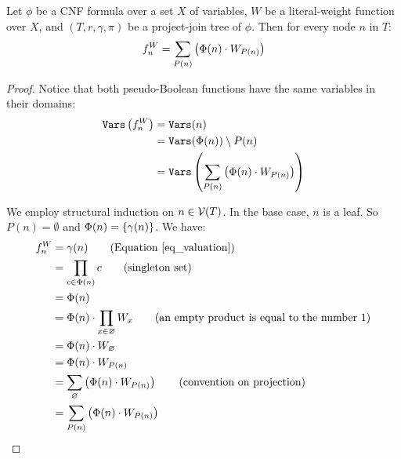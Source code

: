 \pagebreak

\begin{lemma}
\label{lemma_valuation}
    Let $\phi$ be a CNF formula over a set $X$ of variables, $W$ be a literal-weight function over $X$, and $(T, r, \gamma, \pi)$ be a project-join tree of $\phi$.
    Then for every node $n$ in $T$:
    $$f^W_n = \sum_{P(n)} \left(  \Phi(n) \cdot W_{P(n)}  \right)$$
\end{lemma}
\begin{proof}
    Notice that both pseudo-Boolean functions have the same variables in their domains:
    \begin{align*}
        \texttt{\upshape Vars} \left( f^W_n \right)
        & = \texttt{\upshape Vars}(n) \\
        & = \texttt{\upshape Vars}(\Phi(n)) \setminus P(n) \\
        & = \texttt{\upshape Vars} \left(  \sum_{P(n)} \left(  \Phi(n) \cdot W_{P(n)}  \right)  \right)
    \end{align*}

    We employ structural induction on $n \in \mathcal{V}(T)$.
    In the base case, $n$ is a leaf.
    So $P(n) = \emptyset$ and $\Phi(n) = \left\{ \gamma(n) \right\}$.
    We have:
    \begin{align*}
        f^W_n
        & = \gamma(n) \tag{Equation \eqref{eq_valuation}} \\
        & = \prod_{c \in \Phi(n)} c \tag{singleton set} \\
        & = \Phi(n)
        \\
        & = \Phi(n) \mult \prod_{x \in \emptyset} W_x \tag{an empty product is equal to the number $1$} \\
        & = \Phi(n) \mult W_\emptyset \\
        & = \Phi(n) \mult W_{P(n)} \\
        & = \proj_{\emptyset} \pars{ \Phi(n) \mult W_{P(n)} } \tag{convention on projection} \\
        & = \proj_{P(n)} \pars{ \Phi(n) \mult W_{P(n)} }
    \end{align*}


\end{proof}
